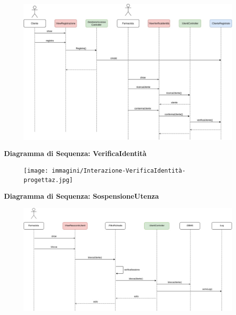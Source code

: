 \begin{figure}[h!]
    \begin{center}
        \includegraphics[width=\textwidth]{immagini/Interazione-RegistrazioneUtente.jpg}
    \end{center}
\end{figure}

\newpage
\textbf{Diagramma di Sequenza: VerificaIdentità}

\begin{figure}[h!]
    \begin{center}
        \texttt{[image: immagini/Interazione-VerificaIdentità-progettaz.jpg]}
    \end{center}
\end{figure}

\textbf{Diagramma di Sequenza: SospensioneUtenza}
\begin{figure}[h!]
    \begin{center}
        \includegraphics[width=\textwidth]{immagini/Interazione-SospensioneUtenza-progettaz.jpg}
    \end{center}
\end{figure}


